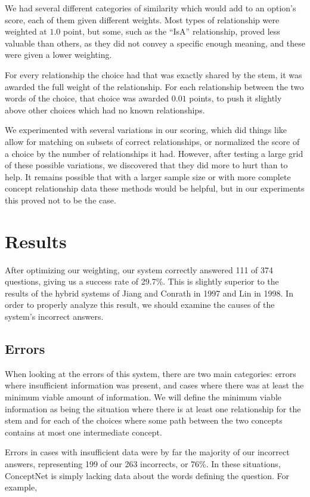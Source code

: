\documentclass[11pt]{article}
\begin{document}
We had several different categories of similarity which would add to an option's score, each of them given different weights. Most types of relationship were weighted at $1.0$ point, but some, such as the ``IsA'' relationship, proved less valuable than others, as they did not convey a specific enough meaning, and these were given a lower weighting.

For every relationship the choice had that was exactly shared by the stem, it was awarded the full weight of the relationship. For each relationship between the two words of the choice, that choice was awarded $0.01$ points, to push it slightly above other choices which had no known relationships.

We experimented with several variations in our scoring, which did things like allow for matching on subsets of correct relationships, or normalized the score of a choice by the number of relationships it had. However, after testing a large grid of these possible variations, we discovered that they did more to hurt than to help. It remains possible that with a larger sample size or with more complete concept relationship data these methods would be helpful, but in our experiments this proved not to be the case.

\section{Results}

After optimizing our weighting, our system correctly answered 111 of 374 questions, giving us a success rate of 29.7\%. This is slightly superior to the results of the hybrid systems of Jiang and Conrath in 1997 and Lin in 1998. In order to properly analyze this result, we should examine the causes of the system's incorrect answers.

\subsection{Errors}

When looking at the errors of this system, there are two main categories: errors where insufficient information was present, and cases where there was at least the minimum  viable amount of information. We will define the minimum viable information as being the situation where there is at least one relationship for the stem and for each of the choices where some path between the two concepts contains at most one intermediate concept.

Errors in cases with insufficient data were by far the majority of our incorrect answers, representing 199 of our 263 incorrects, or 76\%. In these situations, ConceptNet is simply lacking data about the words defining the question. For example,
\end{document}
